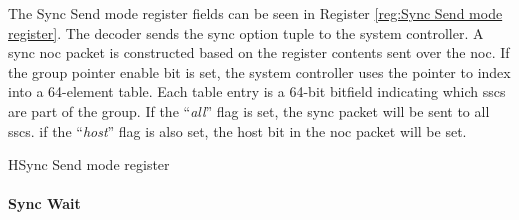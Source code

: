 The Sync Send mode register fields can be seen in Register \ref{reg:Sync Send mode register}.
The decoder sends the sync option tuple to the system controller.
A sync \ac{noc} packet is constructed based on the register contents sent over the \ac{noc}.
If the group pointer enable bit is set, the system controller uses the pointer to index into a 64-element table. 
Each table entry is a 64-bit bitfield indicating which \acp{ssc} are part of the group.
If the ``{\textit{all}}'' flag is set, the sync packet will be sent to all \acp{ssc}.
if the ``{\textit{host}}'' flag is also set, the host bit in the \ac{noc} packet will be set.
\begin{register}{H}{Sync Send mode register}{}%
  \label{reg:Sync Send mode register}
  \vspace{-20pt}
\end{register}

\paragraph{Sync Wait}

